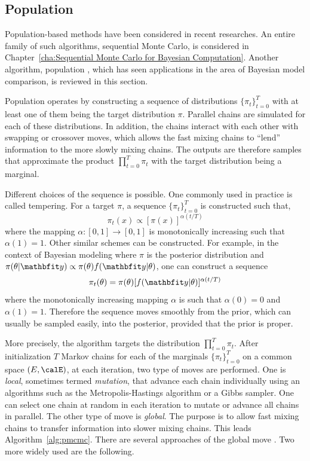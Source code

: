 \subsection{Population \protect\mcmc}
\label{sub:Population mcmc}

Population-based methods have been considered in recent researches. An entire
family of such algorithms, sequential Monte Carlo, is considered in
Chapter~\ref{cha:Sequential Monte Carlo for Bayesian Computation}. Another
algorithm, population \mcmc, which has seen applications in the area of
Bayesian model comparison, is reviewed in this section.

Population \mcmc operates by constructing a sequence of distributions
$\{\pi_t\}_{t=0}^T$ with at least one of them being the target distribution
$\pi$. Parallel \mcmc chains are simulated for each of these distributions. In
addition, the chains interact with each other with swapping or crossover
moves, which allows the fast mixing chains to ``lend'' information to the more
slowly mixing chains. The outputs are therefore samples that approximate the
product $\prod_{t=0}^T\pi_t$ with the target distribution being a marginal.

Different choices of the sequence is possible. One commonly used in practice
is called tempering. For a target $\pi$, a sequence $\{\pi_t\}_{t=0}^T$ is
constructed such that,
\begin{equation}
  \pi_t(x) \propto [\pi(x)]^{\alpha(t/T)}
\end{equation}
where the mapping $\alpha:[0,1]\to[0,1]$ is monotonically increasing such that
$\alpha(1) = 1$. Other similar schemes can be constructed. For example, in the
context of Bayesian modeling where $\pi$ is the posterior distribution and
$\pi(\theta|\data) \propto \pi(\theta)f(\data|\theta)$, one can construct a
sequence
\begin{equation}
  \pi_t(\theta) = \pi(\theta)[f(\data|\theta)]^{\alpha(t/T)}
  \label{eq:power post}
\end{equation}
where the monotonically increasing mapping $\alpha$ is such that $\alpha(0) =
0$ and $\alpha(1) = 1$. Therefore the sequence moves smoothly from the prior,
which can usually be sampled easily, into the posterior, provided that the
prior is proper.

More precisely, the algorithm targets the distribution $\prod_{t=0}^T\pi_t$.
After initialization $T$ Markov chains for each of the marginals
$\{\pi_t\}_{t=0}^T$ on a common space $(E,\calE)$, at each iteration, two type
of moves are performed. One is \emph{local}, sometimes termed \emph{mutation},
that advance each chain individually using an \mcmc algorithms such as the
Metropolis-Hastings algorithm or a Gibbs sampler. One can select one chain
at random in each iteration to mutate or advance all chains in parallel. The
other type of move is \emph{global}. The purpose is to allow fast mixing
chains to transfer information into slower mixing chains. This leads
Algorithm~\ref{alg:pmcmc}. There are several approaches of the global move
\cite{Jasra:2007in}. Two more widely used are the following.

